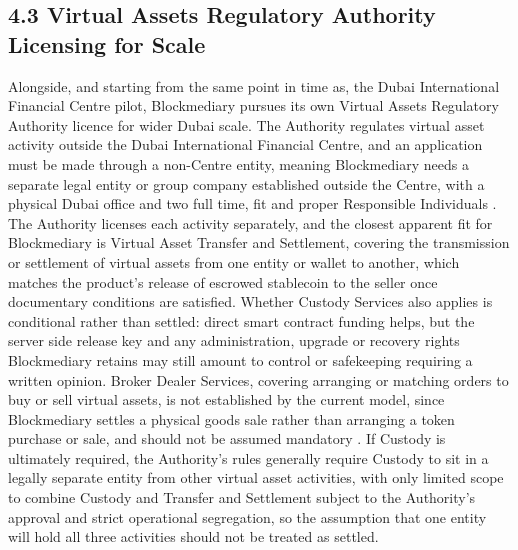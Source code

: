 \documentclass[12pt, a4paper]{article}
\begin{document}
\subsection*{4.3 Virtual Assets Regulatory Authority Licensing for Scale}

Alongside, and starting from the same point in time as, the Dubai International Financial
Centre pilot, Blockmediary pursues its own Virtual Assets Regulatory Authority licence for
wider Dubai scale. The Authority regulates virtual asset activity outside the Dubai
International Financial Centre, and an application must be made through a non-Centre
entity, meaning Blockmediary needs a separate legal entity or group company established
outside the Centre, with a physical Dubai office and two full time, fit and proper
Responsible Individuals \citep{difcvarareport2026}. The Authority licenses each activity
separately, and the closest apparent fit for Blockmediary is Virtual Asset Transfer and
Settlement, covering the transmission or settlement of virtual assets from one entity or
wallet to another, which matches the product's release of escrowed stablecoin to the
seller once documentary conditions are satisfied. Whether Custody Services also applies is
conditional rather than settled: direct smart contract funding helps, but the server side
release key and any administration, upgrade or recovery rights Blockmediary retains may
still amount to control or safekeeping requiring a written opinion. Broker Dealer
Services, covering arranging or matching orders to buy or sell virtual assets, is not
established by the current model, since Blockmediary settles a physical goods sale rather
than arranging a token purchase or sale, and should not be assumed mandatory
\citep{difcvarareport2026}. If Custody is ultimately required, the Authority's rules
generally require Custody to sit in a legally separate entity from other virtual asset
activities, with only limited scope to combine Custody and Transfer and Settlement subject
to the Authority's approval and strict operational segregation, so the assumption that one
entity will hold all three activities should not be treated as settled.
\end{document}
